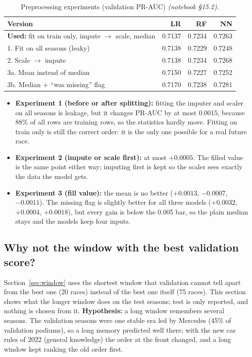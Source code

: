 \documentclass[11pt,a4paper]{article}
\newcommand{\nb}[1]{\textit{(notebook \S#1)}}
\begin{document}
\begin{table}[H]
\centering\small
\caption{Preprocessing experiments (validation PR-AUC) \nb{15.2}.}
\label{tab:order}
\begin{tabular}{lrrr}
\toprule
Version & LR & RF & NN \\
\midrule
\textbf{Used:} fit on train only, impute $\rightarrow$ scale, median & 0.7137 & 0.7234 & 0.7263 \\
1. Fit on all seasons (leaky) & 0.7138 & 0.7229 & 0.7248 \\
2. Scale $\rightarrow$ impute & 0.7138 & 0.7234 & 0.7268 \\
3a. Mean instead of median & 0.7150 & 0.7227 & 0.7252 \\
3b. Median + ``was missing'' flag & 0.7170 & 0.7238 & 0.7281 \\
\bottomrule
\end{tabular}
\end{table}

\begin{itemize}
\item \textbf{Experiment 1 (before or after splitting):} fitting the imputer and scaler on all seasons is leakage, but it changes PR-AUC by at most 0.0015, because 88\% of all rows are training rows, so the statistics hardly move. Fitting on train only is still the correct order: it is the only one possible for a real future race.
\item \textbf{Experiment 2 (impute or scale first):} at most $+0.0005$. The filled value is the same point either way; imputing first is kept so the scaler sees exactly the data the model gets.
\item \textbf{Experiment 3 (fill value):} the mean is no better ($+0.0013$, $-0.0007$, $-0.0011$). The missing flag is slightly better for all three models ($+0.0032$, $+0.0004$, $+0.0018$), but every gain is below the 0.005 bar, so the plain median stays and the models keep four inputs.
\end{itemize}

\subsection{Why not the window with the best validation score?}\label{sec:formtest}
Section~\ref{sec:window} uses the shortest window that validation cannot tell apart from the best one (20 races) instead of the best one itself (75 races). This section shows what the longer window does on the test seasons; test is only reported, and nothing is chosen from it. \textbf{Hypothesis:} a long window remembers several seasons. The validation seasons were one stable era led by Mercedes (45\% of validation podiums), so a long memory predicted well there; with the new car rules of 2022 (general knowledge) the order at the front changed, and a long window kept ranking the old order first.
\end{document}
